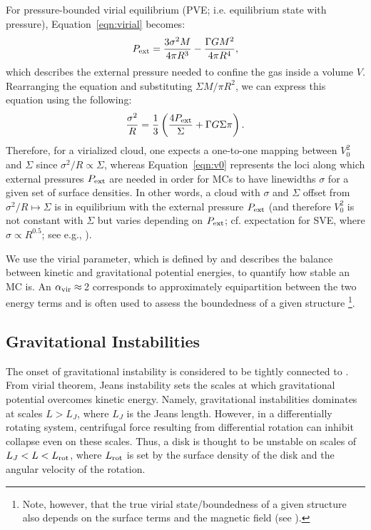 \IfFileExists{emulateapjlegacy.cls}{\documentclass[iop]{emulateapjlegacy}}{\documentclass[iop]{emulateapj}}
\begin{document}
For pressure-bounded virial equilibrium (PVE; i.e. equilibrium state with pressure), %
Equation~\ref{eqn:virial} becomes:
\begin{equation}
P_{\rm ext} = \frac{3\sigma^2M}{4\pi R^3} - \frac{\Gamma G M^2}{4\pi R^4},
\label{eqn:pext}
\end{equation}
which describes the external pressure needed to confine the gas inside a volume $V$.
Rearranging the equation and substituting $\Sigma$\eq$M/\pi R^2$, we can express
this equation using the following:
\begin{equation}
\frac{\sigma^2}{R} = \frac{1}{3}\left(\frac{4P_{\rm ext}}{\Sigma} + \Gamma G \Sigma \pi \right).
\label{eqn:v0}
\end{equation}
Therefore, for a virialized cloud, one expects a one-to-one mapping between $V_0^2$ and $\Sigma$ since
$\sigma^2/R\propto\Sigma$, whereas
Equation~\ref{eqn:v0} represents the loci along which external pressures $P_{\rm ext}$ are
needed in order for MCs to have linewidths $\sigma$ for a given set of surface densities. %
In other words, a cloud with $\sigma$ and $\Sigma$ offset from $\sigma^2/R\mapsto\Sigma$
is in equilibrium with the external pressure $P_{\rm ext}$ (and therefore $V_0^2$ is not constant with $\Sigma$ but
varies depending on $P_{\rm ext}$; cf. expectation for SVE, where
$\sigma\propto R^{0.5}$; see e.g., \citealt{Heyer09a, Hughes10a, Hughes13b, Meidt13a}).

We use the virial parameter, which is defined by  and describes
the balance between kinetic and gravitational potential energies,
to quantify how stable an MC is.
An $\alpha_{\rm vir}\approx$\,2 corresponds to approximately equipartition between the two energy terms
and is often used to assess the boundedness of a given structure \citep[see e.g., ][]{Kauffmann17b}\footnote{Note, however, that
the true virial state/boundedness of a given structure also depends on the surface terms and the magnetic field (see ).}.

\subsection{Gravitational Instabilities}   \label{sec:Q}
The onset of gravitational instability is considered to be tightly connected to \SF \citep[e.g.,][]{Kennicutt89a, Wang94a, Li05b, Li06a}.
From virial theorem, Jeans 
instability sets the scales at which gravitational potential overcomes kinetic energy. Namely, gravitational instabilities 
dominates at scales $L > L_J$, where $L_J$ is the Jeans length. 
However, in a differentially rotating system, centrifugal force resulting from differential rotation can 
inhibit collapse even on these scales. Thus, a disk is thought to be 
unstable on scales of $L_J < L < L_{\rm rot}$, where $L_{\rm rot}$ is set 
by the surface density of the disk and the angular velocity of the rotation. 
\end{document}
